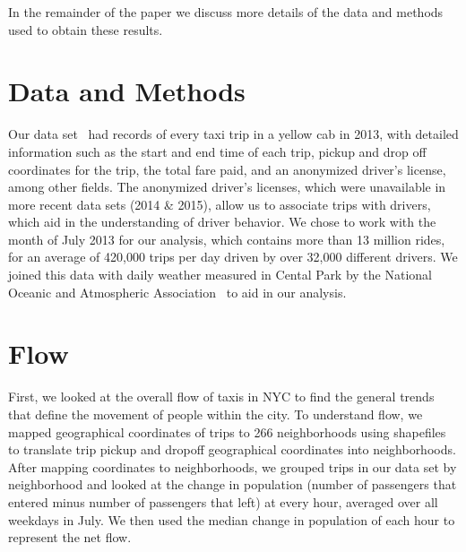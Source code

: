 \documentclass[twocolumn]{article}
\begin{document}
In the remainder of the paper we discuss more details of the data and methods used to obtain these results.

\section{Data and Methods}
Our data set~\cite{WHONG:2014} had records of every taxi trip in a yellow cab in 2013, with detailed information such as the start and end time of each trip, pickup and drop off coordinates for the trip, the total fare paid, and an anonymized driver's license, among other fields. The anonymized driver's licenses, which were unavailable in more recent data sets (2014 \& 2015), allow us to associate trips with drivers, which aid in the understanding of driver behavior. %
We chose to work with the month of July 2013 for our analysis, which contains more than 13 million rides, for an average of 420,000 trips per day driven by over 32,000 different drivers.
We joined this data with daily weather measured in Cental Park by the National Oceanic and Atmospheric Association~\cite{NOAA:2016} to aid in our analysis.

\section{Flow}
First, we looked at the overall flow of taxis in NYC to find the general trends that define the movement of people within the city. To understand flow, we mapped geographical coordinates of trips to 266 neighborhoods using shapefiles~\cite{PEDIACITIES:2015} to translate trip pickup and dropoff geographical coordinates into neighborhoods.  After mapping coordinates to neighborhoods, we grouped trips in our data set by neighborhood and looked at the change in population (number of passengers that entered minus number of passengers that left) at every hour, averaged over all weekdays in July. We then used the median change in population of each hour to represent the net flow.
\end{document}
